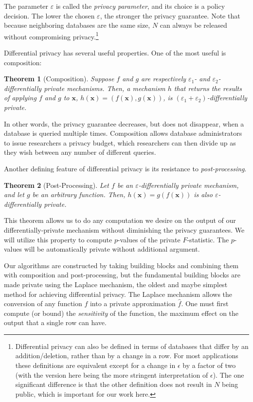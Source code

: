 \documentclass[USenglish,oneside]{article}
\newcounter{ab}
\newcounter{ar}
\newcounter{igh}
\newcounter{ms}
\newtheorem{theorem}{Theorem}
\newcommand{\eps}{\ensuremath{\varepsilon}\xspace}
\newcommand{\x}{\ensuremath{\mathbf{x}}\xspace}
\begin{document}
The parameter \eps is called the \textit{privacy parameter}, and its choice is a policy decision. The lower the chosen \eps, the stronger the privacy guarantee. Note that because neighboring databases are the same size, $N$ can always be released without compromising privacy.\footnote{Differential privacy can also be defined in terms of databases that differ by an addition/deletion, rather than by a change in a row.  For most applications these definitions are equivalent except for a change in $\epsilon$ by a factor of two (with the version here being the more stringent interpretation of $\epsilon$). The one significant difference is that the other definition does not result in $N$ being public, which is important for our work here.}

Differential privacy has several useful properties.  One of the most useful is composition:

\begin{theorem}[Composition]\label{thm:composition} Suppose $f$ and $g$ are respectively $\eps_{1}$- and $\eps_{2}$-differentially private mechanisms. Then, a mechanism $h$ that returns the results of applying $f$ and $g$ to \x, $h(\x) = (f(\x), g(\x))$, is $(\eps_{1} + \eps_{2})$-differentially private.
\end{theorem}

In other words, the privacy guarantee decreases, but does not disappear, when a database is queried multiple times.  Composition allows database administrators to issue researchers a privacy budget, which researchers can then divide up as they wish between any number of different queries.

Another defining feature of differential privacy is its resistance to \textit{post-processing}.

\begin{theorem}[Post-Processing] \label{thm:postprocessing}
Let $f$ be an $\eps$-differentially private mechanism, and let $g$ be an arbitrary function. Then, $h(\x) = g(f(\x))$ is also $\eps$-differentially private.
\end{theorem}

This theorem allows us to do any computation we desire on the output of our differentially-private mechanism without diminishing the privacy guarantees. We will utilize this property to compute $p$-values of the private $F$-statistic.  The $p$-values will be automatically private without additional argument.

Our algorithms are constructed by taking building blocks and combining them with composition and post-processing, but the fundamental building blocks are made private using the Laplace mechanism, the oldest and maybe simplest method for achieving differential privacy.  The Laplace mechanism allows the conversion of any function $f$ into a private approximation $\hat{f}$. One must first compute (or bound) the \textit{sensitivity} of the function, the maximum effect on the output that a single row can have.
\end{document}
